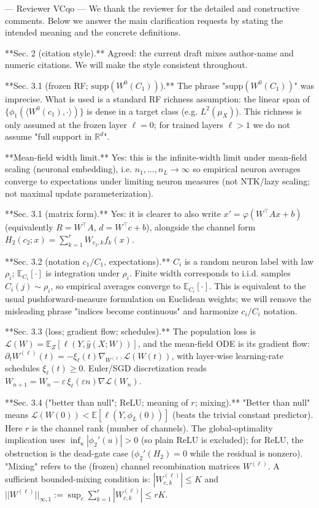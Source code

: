--- Reviewer VCqo ---
We thank the reviewer for the detailed and constructive comments. Below we answer the main clarification requests by stating the intended meaning and the concrete definitions.

**Sec. 2 (citation style).** Agreed: the current draft mixes author-name and numeric citations. We will make the style consistent throughout.

**Sec. 3.1 (frozen RF; $\mathrm{supp}(W^0(C_1))$).** The phrase "$\mathrm{supp}(W^0(C_1))$" was imprecise. What is used is a standard RF richness assumption: the linear span of $\{\phi_1(\langle W^0(c_1),\cdot\rangle)\}$ is dense in a target class (e.g. $L^2(\mu_X)$). This richness is only assumed at the frozen layer $\ell=0$; for trained layers $\ell>1$ we do not assume "full support in $\mathbb{R}^d$".

**Mean-field width limit.** Yes: this is the infinite-width limit under mean-field scaling (neuronal embedding), i.e. $n_1,\dots,n_L\to\infty$ so empirical neuron averages converge to expectations under limiting neuron measures (not NTK/lazy scaling; not maximal update parameterization).

**Sec. 3.1 (matrix form).** Yes: it is clearer to also write $x'=\varphi(W^\top A x + b)$ (equivalently $R=W^\top A$, $d=W^\top c+b$), alongside the channel form $H_2(c_2;x)=\sum_{k=1}^r W_{c_2,k} f_k(x)$.

**Sec. 3.2 (notation $c_1/C_1$, expectations).** $C_i$ is a random neuron label with law $\rho_i$; $\mathbb{E}_{C_i}[\cdot]$ is integration under $\rho_i$. Finite width corresponds to i.i.d. samples $C_i(j)\sim\rho_i$, so empirical averages converge to $\mathbb{E}_{C_i}[\cdot]$. This is equivalent to the usual pushforward-measure formulation on Euclidean weights; we will remove the misleading phrase "indices become continuous" and harmonize $c_i/C_i$ notation.

**Sec. 3.3 (loss; gradient flow; schedules).** The population loss is $\mathcal{L}(W)=\mathbb{E}_Z[\ell(Y,\hat y(X;W))]$, and the mean-field ODE is its gradient flow:
$\partial_t W^{(\ell)}(t)=-\xi_\ell(t)\nabla_{W^{(\ell)}}\mathcal{L}(W(t))$,
with layer-wise learning-rate schedules $\xi_\ell(t)\ge0$. Euler/SGD discretization reads $W_{n+1}=W_n-\varepsilon\,\xi_\ell(\varepsilon n)\nabla\mathcal{L}(W_n)$.

**Sec. 3.4 ("better than null"; ReLU; meaning of $r$; mixing).** "Better than null" means $\mathcal{L}(W(0))<\mathbb{E}[\ell(Y,\phi_L(0))]$ (beats the trivial constant predictor). Here $r$ is the channel rank (number of channels). The global-optimality implication uses $\inf_u|\phi_2'(u)|>0$ (so plain ReLU is excluded); for ReLU, the obstruction is the dead-gate case ($\phi_2'(H_2)=0$ while the residual is nonzero). "Mixing" refers to the (frozen) channel recombination matrices $W^{(\ell)}$. A sufficient bounded-mixing condition is: $|W^{(\ell)}_{c,k}|\le K$ and $||W^{(\ell)}||_{\infty,1}:=\sup_c\sum_{k=1}^r |W^{(\ell)}_{c,k}|\le rK$.

